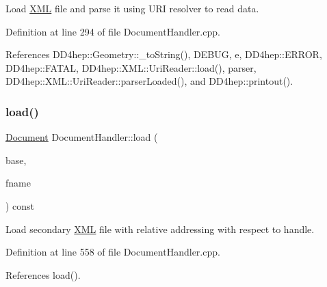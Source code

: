 Load \hyperlink{namespace_d_d4hep_1_1_x_m_l}{X\+ML} file and parse it using U\+RI resolver to read data. 



Definition at line 294 of file Document\+Handler.\+cpp.



References D\+D4hep\+::\+Geometry\+::\+\_\+to\+String(), D\+E\+B\+UG, e, D\+D4hep\+::\+E\+R\+R\+OR, D\+D4hep\+::\+F\+A\+T\+AL, D\+D4hep\+::\+X\+M\+L\+::\+Uri\+Reader\+::load(), parser, D\+D4hep\+::\+X\+M\+L\+::\+Uri\+Reader\+::parser\+Loaded(), and D\+D4hep\+::printout().

\hypertarget{class_d_d4hep_1_1_x_m_l_1_1_document_handler_a97b514603d47fc3e6e2e50f5fb9396c5}{}\label{class_d_d4hep_1_1_x_m_l_1_1_document_handler_a97b514603d47fc3e6e2e50f5fb9396c5} 
\subsubsection{\texorpdfstring{load()}{load()}\hspace{0.1cm}{\footnotesize\ttfamily [3/4]}}
{\footnotesize\ttfamily \hyperlink{class_d_d4hep_1_1_x_m_l_1_1_document}{Document} Document\+Handler\+::load (\begin{DoxyParamCaption}\item[{\hyperlink{class_d_d4hep_1_1_x_m_l_1_1_handle__t}{Handle\+\_\+t}}]{base,  }\item[{const \hyperlink{namespace_d_d4hep_1_1_x_m_l_a09e5d9cc86ed782f6826dfe0778c1815}{Xml\+Char} $\ast$}]{fname }\end{DoxyParamCaption}) const\hspace{0.3cm}{\ttfamily [virtual]}}



Load secondary \hyperlink{namespace_d_d4hep_1_1_x_m_l}{X\+ML} file with relative addressing with respect to handle. 



Definition at line 558 of file Document\+Handler.\+cpp.



References load().

\hypertarget{class_d_d4hep_1_1_x_m_l_1_1_document_handler_aa4ebc7e0ebe23c6f8db43261a0a98e7d}{}\label{class_d_d4hep_1_1_x_m_l_1_1_document_handler_aa4ebc7e0ebe23c6f8db43261a0a98e7d} 
